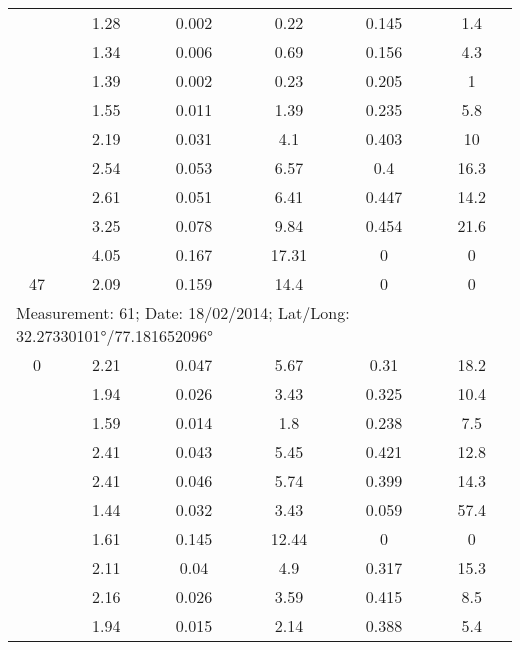 \begin{longtable}{cccccc}
		& 1.28  & 0.002 & 0.22  & 0.145 & 1.4 \\
		
		& 1.34  & 0.006 & 0.69  & 0.156 & 4.3 \\
		
		& 1.39  & 0.002 & 0.23  & 0.205 & 1 \\
		
		& 1.55  & 0.011 & 1.39  & 0.235 & 5.8 \\
		
		& 2.19  & 0.031 & 4.1   & 0.403 & 10 \\
		
		& 2.54  & 0.053 & 6.57  & 0.4   & 16.3 \\
		
		& 2.61  & 0.051 & 6.41  & 0.447 & 14.2 \\
		
		& 3.25  & 0.078 & 9.84  & 0.454 & 21.6 \\
		
		& 4.05  & 0.167 & 17.31 & 0     & 0 \\
		
		47    & 2.09  & 0.159 & 14.4  & 0     & 0 \\
		\midrule
		
		\multicolumn{6}{l}{Measurement: 61; Date: 18/02/2014;
			Lat/Long: 32.27330101°/77.181652096°} \\		
		\midrule
		0     & 2.21  & 0.047 & 5.67  & 0.31  & 18.2 \\
		
		& 1.94  & 0.026 & 3.43  & 0.325 & 10.4 \\
		
		& 1.59  & 0.014 & 1.8   & 0.238 & 7.5 \\
		
		& 2.41  & 0.043 & 5.45  & 0.421 & 12.8 \\
		
		& 2.41  & 0.046 & 5.74  & 0.399 & 14.3 \\
		
		& 1.44  & 0.032 & 3.43  & 0.059 & 57.4 \\
		
		& 1.61  & 0.145 & 12.44 & 0     & 0 \\
		
		& 2.11  & 0.04  & 4.9   & 0.317 & 15.3 \\
		
		& 2.16  & 0.026 & 3.59  & 0.415 & 8.5 \\
		
		& 1.94  & 0.015 & 2.14  & 0.388 & 5.4 \\
		

\end{longtable}
